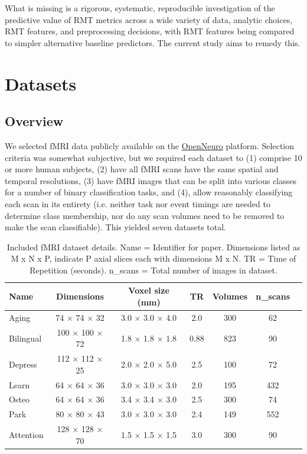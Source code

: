 \documentclass[12pt]{spieman}  %
\begin{document}
\begin{spacing}{2}
What is missing is a rigorous, systematic, reproducible investigation of the
predictive value of RMT metrics across a wide variety of data, analytic
choices, RMT features, and preprocessing decisions, with RMT features being
compared to simpler alternative baseline predictors. The current study aims to
remedy this.


\section{Datasets}
\label{sec:datasets}

\subsection{Overview}

We selected fMRI data publicly available on the
\href{https://openneuro.org/}{OpenNeuro}
platform\cite{markiewiczOpenNeuroResourceSharing2021}. Selection criteria was
somewhat subjective, but we required each dataset to (1) comprise 10 or more
human subjects, (2) have all fMRI scans have the same spatial and temporal
resolutions, (3) have fMRI images that can be split into various classes for a
number of binary classification tasks, and (4), allow reasonably classifying
each scan in its entirety (i.e. neither task nor event timings are needed to
determine class membership, nor do any scan volumes need to be removed to make
the scan classifiable). This yielded seven datasets total.


\begin{table}[h!]
\caption{
    \label{tab:data-dimensions}
    Included fMRI dataset details.
    Name = Identifier for paper.
    Dimensions listed as M x N x P, indicate P axial slices each with dimensions M x N.
    TR = Time of Repetition (seconds).
    n\_scans = Total number of images in dataset.
}
\small
\centering
\begin{tabular}{ l c c c c c c }
\hline
\textbf{Name}    & \textbf{Dimensions}  & \textbf{Voxel size (mm)} & \textbf{TR} & \textbf{Volumes} & \textbf{n\_scans} \\
\hline
Aging     & 74 × 74 × 32   & 3.0 × 3.0 × 4.0 & 2.0  & 300 & 62  \\
Bilingual    & 100 × 100 × 72 & 1.8 × 1.8 × 1.8 & 0.88 & 823 & 90  \\
Depress   & 112 × 112 × 25 & 2.0 × 2.0 × 5.0 & 2.5  & 100 & 72  \\
Learn     & 64 × 64 × 36   & 3.0 × 3.0 × 3.0 & 2.0  & 195 & 432 \\
Osteo     & 64 × 64 × 36   & 3.4 × 3.4 × 3.0 & 2.5  & 300 & 74  \\
Park      & 80 × 80 × 43   & 3.0 × 3.0 × 3.0 & 2.4  & 149 & 552 \\
Attention & 128 × 128 × 70 & 1.5 × 1.5 × 1.5 & 3.0  & 300 & 90  \\
\hline
\end{tabular}
\end{table}


\end{spacing}
\end{document}
